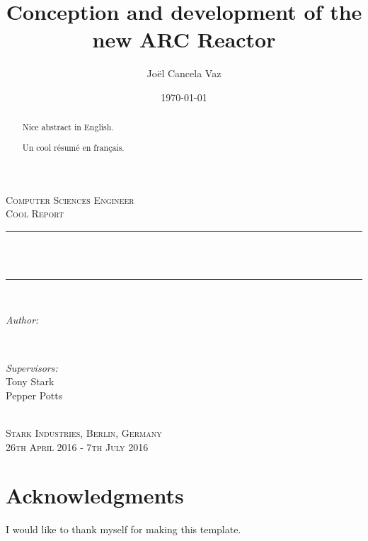 \documentclass[a4paper]{article} %
\title{Conception and development of the new ARC Reactor} %
\author{Joël Cancela Vaz}	%
\date{\today}	%
\makeatletter
\let\thetitle\@title
\let\theauthor\@author
\let\thedate\@date
\makeatother
\begin{document}
\begin{titlepage}
\thispagestyle{titlestyle}
\centering
\vspace*{2.5 cm}
\textsc{\LARGE Computer Sciences Engineer}\\[0.5 cm]
\textsc{\Large Cool Report}\\[1 cm]
\rule{\linewidth}{0.2 mm} \\[0.4 cm]
{ \huge \bfseries \thetitle }\\
\rule{\linewidth}{0.2 mm} \\[1.5 cm]
\begin{minipage}{0.4\textwidth}
\begin{flushleft} \large
\emph{Author:}\\
\theauthor
\end{flushleft}
\end{minipage}~
\begin{minipage}{0.4\textwidth}
\begin{flushright} \large
\emph{Supervisors:} \\
Tony Stark\\
Pepper Potts
\end{flushright}
\end{minipage}\\[2 cm]
\textsc{\Large Stark Industries, Berlin, Germany}\\[1 cm]	
\textsc{\large 26th April 2016 - 7th July 2016}\\[1 cm]	
\vfill
\end{titlepage}
\setlength{\headheight}{12pt} %
\newpage
\section*{Acknowledgments}
I would like to thank myself for making this template.
\newpage
\renewcommand{\abstractname}{Abstract}
\begin{abstract}
Nice abstract in English.
\end{abstract}
\vspace{0.5cm}
\renewcommand{\abstractname}{Résumé}
\begin{abstract}
Un cool résumé en français.
\end{abstract}
\newpage
\tableofcontents
\newpage
\listoffigures
\listoftables
\newpage
\end{document}
